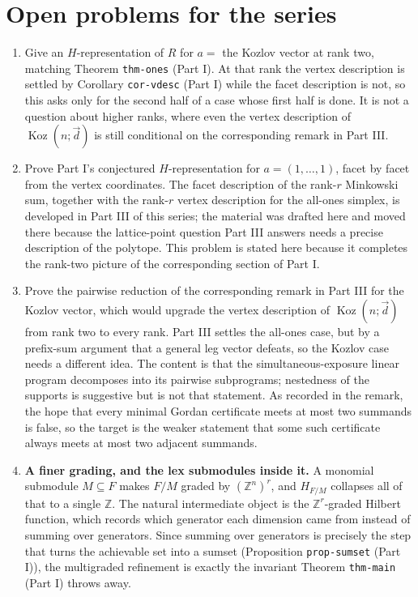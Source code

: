 \documentclass[11pt, a4paper, abstract=yes]{scrartcl}
\theoremstyle{definition}
\theoremstyle{remark}
\theoremstyle{plain}
\newcommand{\Koz}{\operatorname{Koz}}
\begin{document}
\section{Open problems for the series}
\label{sec:orgf37282b}
\begin{enumerate}
\item Give an \(H\)-representation of \(R\) for \(a=\) the Kozlov vector at rank two, matching Theorem
\texttt{thm-ones} (Part I). At that rank the vertex description is settled by Corollary \texttt{cor-vdesc} (Part I) while the
facet description is not, so this asks only for the second half of a case whose first half is
done. It is not a question about higher ranks, where even the vertex description of
\(\Koz(n;\vec d)\) is still conditional on the corresponding remark in Part III.
\item Prove Part I's conjectured \(H\)-representation for \(a=(1,\dots,1)\), facet by facet
from the vertex coordinates. The facet description of the rank-\(r\) Minkowski sum, together with
the rank-\(r\) vertex description for the all-ones simplex, is developed in Part III of this
series; the material was drafted here and moved there because the lattice-point question Part III
answers needs a precise description of the polytope. This problem is stated here because it
completes the rank-two picture of the corresponding section of Part I.
\item Prove the pairwise reduction of the corresponding remark in Part III for the Kozlov vector, which would upgrade
the vertex description of \(\Koz(n;\vec d)\) from rank two to every rank. Part III settles the
all-ones case, but by a prefix-sum argument that a general leg vector defeats, so the Kozlov case
needs a different idea. The content is that the
simultaneous-exposure linear program decomposes into its pairwise subprograms; nestedness of the
supports is suggestive but is not that statement. As recorded in the remark, the hope that every
minimal Gordan certificate meets at most two summands is false, so the target is the weaker
statement that some such certificate always meets at most two adjacent summands.
\item \textbf{A finer grading, and the lex submodules inside it.} A monomial submodule \(M\subseteq F\) makes
\(F/M\) graded by \((\mathbb Z^n)^r\), and \(H_{F/M}\) collapses all of that to a single
\(\mathbb Z\). The natural intermediate object is the \(\mathbb Z^r\)-graded Hilbert function,
which records which generator each dimension came from instead of summing over generators. Since
summing over generators is precisely the step that turns the achievable set into a sumset
(Proposition \texttt{prop-sumset} (Part I)), the multigraded refinement is exactly the invariant Theorem \texttt{thm-main} (Part I)
throws away.


\end{enumerate}
\end{document}
